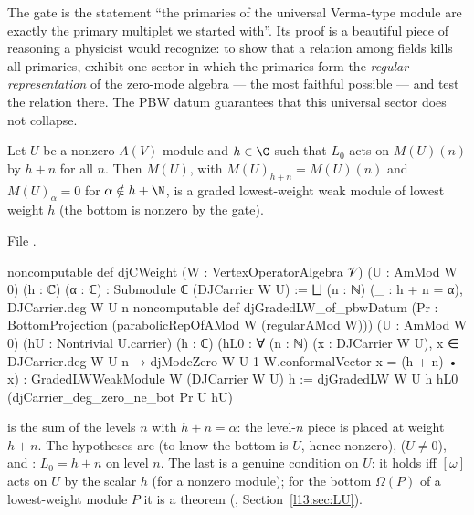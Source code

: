 \begin{physics}
The gate is the statement ``the primaries of the universal Verma-type module are exactly the primary multiplet we started
with''. Its proof is a beautiful piece of reasoning a physicist would recognize: to show that a relation among fields kills all
primaries, exhibit one sector in which the primaries form the \emph{regular representation} of the zero-mode algebra --- the
most faithful possible --- and test the relation there. The PBW datum guarantees that this universal sector does not collapse.
\end{physics}

\begin{definition}\label{l13:def:djgradedlw}
Let $U$ be a nonzero $A(V)$-module and $h\in\C$ such that $L_0$ acts on $M(U)(n)$ by $h+n$ for all $n$. Then $M(U)$, with
$M(U)_{h+n} = M(U)(n)$ and $M(U)_\alpha = 0$ for $\alpha\notin h+\N$, is a graded lowest-weight weak module of lowest weight $h$
(the bottom is nonzero by the gate).
\end{definition}
\noindent File .
\begin{leancode}
noncomputable def djCWeight (W : VertexOperatorAlgebra 𝒱) (U : AmMod W 0) (h : ℂ) (α : ℂ) :
    Submodule ℂ (DJCarrier W U) :=
  ⨆ (n : ℕ) (_ : h + n = α), DJCarrier.deg W U n
noncomputable def djGradedLW_of_pbwDatum
    (Pr : BottomProjection (parabolicRepOfAMod W (regularAMod W))) (U : AmMod W 0)
    (hU : Nontrivial U.carrier) (h : ℂ)
    (hL0 : ∀ (n : ℕ) (x : DJCarrier W U), x ∈ DJCarrier.deg W U n →
      djModeZero W U 1 W.conformalVector x = (h + n) • x) :
    GradedLWWeakModule W (DJCarrier W U) h :=
  djGradedLW W U h hL0 (djCarrier_deg_zero_ne_bot Pr U hU)
\end{leancode}

\begin{dictionary}
 is the sum of the levels $n$ with $h+n = \alpha$: the level-$n$ piece is
placed at weight $h+n$. The hypotheses are  (to know the bottom is $U$, hence nonzero), 
($U\neq0$), and : $L_0 = h+n$ on level $n$. The last is a genuine condition on $U$: it holds iff $[\omega]$ acts on $U$
by the scalar $h$ (for a nonzero module); for the bottom $\Omega(P)$ of a lowest-weight module $P$ it is a theorem
(, Section~\ref{l13:sec:LU}).
\end{dictionary}

